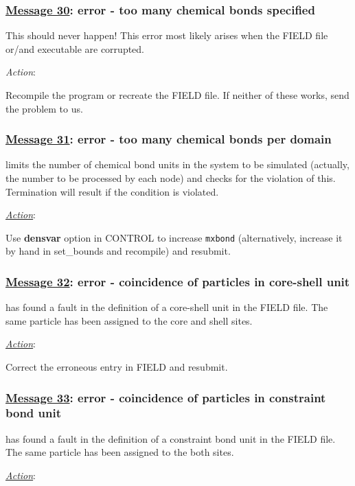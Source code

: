 \subsubsection*{\underline{Message 30}: error - too many chemical bonds specified}

This should never happen!  This error most likely arises when the
FIELD file or/and \D executable are corrupted.

{\em Action}:

Recompile the program or recreate the FIELD file.  If neither of
these works, send the problem to us.

\subsubsection*{\underline{Message 31}: error - too many chemical bonds per domain}

\D limits the number of chemical bond units
in the system to be simulated (actually, the number to be processed
by each node) and checks for the violation of this.  Termination will
result if the condition is violated.

\noindent \underline{\em Action}:

Use {\bf densvar} option in CONTROL to increase {\tt mxbond}
(alternatively, increase it by hand in {\sc set\_bounds} and
recompile) and resubmit.

\subsubsection*{\underline{Message 32}: error - coincidence of particles in core-shell unit}

\D has found a fault in the definition of a core-shell unit in the
FIELD file.  The same particle has been assigned to the core and
shell sites.

\noindent \underline{\em Action}:

Correct the erroneous entry in FIELD and resubmit.

\subsubsection*{\underline{Message 33}: error - coincidence of particles in constraint bond unit}

\D has found a fault in the definition of a constraint bond unit
in the FIELD file.  The same particle has been assigned to the
both sites.

\noindent \underline{\em Action}:

